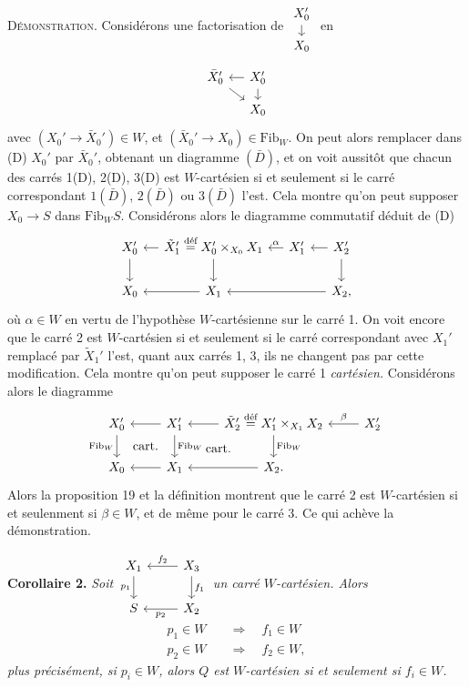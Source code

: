 \documentclass[11pt]{article}
\newcommand{\printedpage}[1]{\marginpar{\footnotesize p.~#1}}
\newcommand{\msp}[1]{\marginpar{\footnotesize [#1]}}
\newcommand{\Fib}{\mathrm{Fib}}
\begin{document}
\textsc{Démonstration}. Considérons une factorisation de $\begin{tikzcd}[ampersand replacement=\&, row sep=small] X_0' \arrow[d] \\ X_0 \end{tikzcd}$ en
\[
\begin{tikzcd}[ampersand replacement=\&, column sep=small, row sep=small]
\bar{X}_0' \arrow[dr] \& X_0' \arrow[l] \arrow[d] \\
\& X_0
\end{tikzcd}
\]
avec $(X_0'\longrightarrow\bar{X}_0')\in W$, et $(\bar{X}_0'\longrightarrow X_0)\in\Fib_W$. On peut alors remplacer dans (D) $X_0'$ par $\bar{X}_0'$, obtenant un diagramme $(\bar{D})$, et on voit aussitôt
\printedpage{169}
\msp{page 260}
que chacun des carrés 1(D), 2(D), 3(D) est $W$-cartésien si et seulement si le carré correspondant $1(\bar{D})$, $2(\bar{D})$ ou $3(\bar{D})$ l'est. Cela montre qu'on peut supposer $X_0\longrightarrow S$ dans $\Fib_W S$. Considérons alors le diagramme commutatif déduit de (D)
\[
\begin{tikzcd}[ampersand replacement=\&, column sep=small]
X_0' \arrow[d] \& \tilde{X}_1'\overset{\text{déf}}{=}X_0'\times_{X_0}X_1 \arrow[l] \arrow[d] \& X_1' \arrow[l, "\alpha"'] \& X_2' \arrow[l] \arrow[d] \\
X_0 \& X_1 \arrow[l] \& \& X_2, \arrow[ll]
\end{tikzcd}
\]
où $\alpha\in W$ en vertu de l'hypothèse $W$-cartésienne sur le carré 1. On voit encore que le carré 2 est $W$-cartésien si et seulement si le carré correspondant avec $X_1'$ remplacé par $\tilde{X}_1'$ l'est, quant aux carrés 1, 3, ils ne changent pas par cette modification. Cela montre qu'on peut supposer le carré 1 \textit{cartésien.} Considérons alors le diagramme
\[
\begin{tikzcd}[ampersand replacement=\&]
X_0' \arrow[d, "\mathrm{Fib}_W"'] \& X_1' \arrow[l] \arrow[d, "\mathrm{Fib}_W"] \arrow[dl, phantom, "\text{cart.}"] \& \tilde{X}_2'\overset{\text{déf}}{=}X_1'\times_{X_1}X_2 \arrow[l] \arrow[d, "\mathrm{Fib}_W"] \arrow[dl, phantom, "\text{cart.}"] \& X_2' \arrow[l, "\beta"'] \\
X_0 \& X_1 \arrow[l] \& X_2. \arrow[l]
\end{tikzcd}
\]
Alors la proposition 19 et la définition montrent que le carré 2 est $W$-cartésien si et seulenment si $\beta\in W$, et de même pour le carré 3. Ce qui achève la démonstration. %

\textbf{Corollaire 2.} \textit{Soit $\begin{tikzcd}[ampersand replacement=\&] X_1 \arrow[d, "p_1"'] \& X_3 \arrow[l, "f_2"'] \arrow[d, "f_1"] \\ S \& X_2 \arrow[l, "p_2"] \end{tikzcd}$ un carré $W$-cartésien. Alors}
\[
\begin{aligned}
p_1\in W\quad&\Longrightarrow\quad f_1\in W\\
p_2\in W\quad&\Longrightarrow\quad f_2\in W,
\end{aligned}
\]
\textit{plus précisément, si $p_i\in W$, alors $Q$ est $W$-cartésien si et seulement si $f_i\in W$.}
\end{document}
